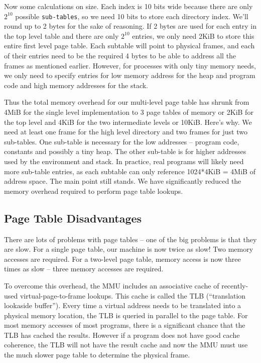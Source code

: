 Now some calculations on size.
Each  index is 10 bits wide because there are only $2^{10}$ possible \texttt{sub-tables}, so we need 10 bits to store each directory index.
We'll round up to 2 bytes for the sake of reasoning.
If 2 bytes are used for each entry in the top level table and there are only $2^{10}$ entries, we only need 2KiB to store this entire first level page table.
Each subtable will point to physical frames, and each of their entries need to be the required 4 bytes to be able to address all the frames as mentioned earlier.
However, for processes with only tiny memory needs, we only need to specify entries for low memory address for the heap and program code and high memory addresses for the stack.

Thus the total memory overhead for our multi-level page table has shrunk from 4MiB for the single level implementation to 3 page tables of memory or 2KiB for the top level and 4KiB for the two intermediate levels or 10KiB.
Here's why.
We need at least one frame for the high level directory and two frames for just two sub-tables.
One sub-table is necessary for the low addresses -- program code, constants and possibly a tiny heap.
The other sub-table is for higher addresses used by the environment and stack.
In practice, real programs will likely need more sub-table entries, as each subtable can only reference 1024*4KiB = 4MiB of address space.
The main point still stands.
We have significantly reduced the memory overhead required to perform page table lookups.

\subsection{Page Table Disadvantages}

There are lots of problems with page tables -- one of the big problems is that they are slow.
For a single page table, our machine is now twice as slow!
Two memory accesses are required.
For a two-level page table, memory access is now three times as slow -- three memory accesses are required.

To overcome this overhead, the MMU includes an associative cache of recently-used virtual-page-to-frame lookups.
This cache is called the TLB (``translation lookaside buffer'').
Every time a virtual address needs to be translated into a physical memory location, the TLB is queried in parallel to the page table.
For most memory accesses of most programs, there is a significant chance that the TLB has cached the results.
However if a program does not have good cache coherence, the TLB will not have the result cache and now the MMU must use the much slower page table to determine the physical frame.

